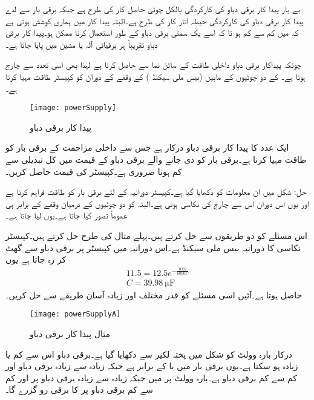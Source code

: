 بے بار پیدا کار برقی دباو کی کارکردگی بالکل چوٹی حاصل کار کی طرح ہے جبکہ برقی بار سے لدے پیدا کار برقی دباو کی کارکردگی حیطہ اتار کار کی طرح ہے۔البتہ پیدا کار میں ہماری کوشش ہوتی ہے کہ   میں  کم سے کم ہو تا کہ اسے یک سمتی برقی دباو کے طور استعمال کرنا ممکن ہو۔پیدا کار برقی دباو تقریباً ہر برقیاتی آلہ یا مشین میں پایا جاتا ہے۔

چونکہ پیداکار برقی دباو داخلی طاقت  کے سائن نما  سے حاصل کرتا ہے لہٰذا  بھی اسی تعدد سے چارج ہوتا ہے۔ کے دو چوٹیوں کے مابین   (بیس ملی سیکنڈ )  کے وقفے  کے دوران  کو کپیسٹر  طاقت مہیا کرتا ہے۔
\begin{figure}
\centering
\texttt{[image: powerSupply]}
\caption{پیدا کار برقی دباو}
\label{شکل_پاور_سپلائی}
\end{figure}
 
ایک عدد  کا پیدا کار برقی دباو درکار ہے جس سے  داخلی مزاحمت کے برقی بار کو طاقت مہیا کرنا ہے۔برقی بار کو دی جانے والے برقی دباو کے قیمت میں کل تبدیلی  سے کم ہونا ضروری ہے۔کپیسٹر  کی قیمت حاصل کریں۔

حل: 
شکل  میں ان معلومات کو دکھایا گیا ہے۔کپیسٹر  دورانیہ کے لئے  برقی بار کو طاقت فراہم کرتا ہے اور یوں اس دوران اس سے چارج کی نکاسی ہوتی ہے۔البتہ  کو دو چوٹیوں کے درمیان وقفے کے برابر ہی عموماً تصور کیا جاتا ہے۔یوں  لیا جاتا ہے۔

اس مسئلے کو دو طریقوں سے حل کرتے ہیں۔پہلے مثال  کی طرح حل کرتے ہیں۔کپیسٹر نکاسی  کا دورانیہ بیس ملی سیکنڈ ہے۔اس دورانیہ میں  کپیسٹر پر  برقی دباو  سے گھٹ کر  رہ جاتا ہے یوں
\begin{align*}
11.5=12.5 e^{-\frac{0.02}{6000C}}\\
C=\SI{39.98}{\micro \farad}
\end{align*}
حاصل ہوتا ہے۔آئیں اسی مسئلے کو قدر مختلف اور زیادہ آسان طریقے سے حل کریں۔
% 
 \begin{figure}
\centering
\texttt{[image: powerSupplyA]}
\caption{مثال پیدا کار برقی دباو}
\label{شکل_مثال_پاور_سپلائی}
\end{figure}

درکار بارہ وولٹ کو شکل  میں پختہ لکیر سے دکھایا گیا ہے۔برقی دباو اس سے  کم یا زیادہ ہو سکتا ہے۔یوں برقی بار میں   یا  کے برابر ہے جبکہ زیادہ سے زیادہ برقی دباو  اور کم سے کم برقی دباو  ہے۔بارہ وولٹ پر  میں  جبکہ زیادہ سے زیادہ برقی دباو پر   اور کم سے کم برقی دباو پر   کا برقی رو گزرے گا۔

